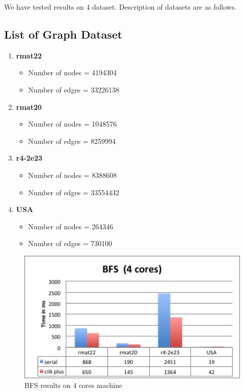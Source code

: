 \documentclass{article}
\begin{document}
We have tested results on 4 dataset. Description of datasets are as follows.
\subsection{List of Graph Dataset}
\begin{enumerate}
\item \textbf{rmat22}
\begin{itemize}
\item Number of nodes = 4194304
\item Number of edges = 33226138
\end{itemize} 

\item \textbf{rmat20}
\begin{itemize}
\item Number of nodes = 1048576
\item Number of edges = 8259994
\end{itemize} 

\item \textbf{r4-2e23}
\begin{itemize}
\item Number of nodes = 8388608
\item Number of edges = 33554432
\end{itemize} 

\item \textbf{USA}
\begin{itemize}
\item Number of nodes = 264346
\item Number of edges = 730100
\end{itemize} 

\end{enumerate}

\begin{figure}
   \centering
   \includegraphics[width=7.0in]{bfs4}
   \caption{BFS results on 4 cores machine}
   \label{graph:bfs4}
\end{figure}
\end{document}

